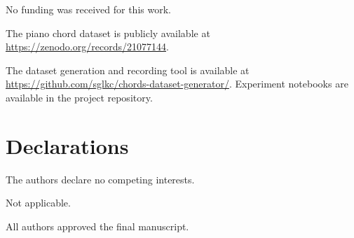 \documentclass[pdflatex,sn-mathphys-num,iicol]{sn-jnl}
\theoremstyle{thmstyleone}
\theoremstyle{thmstyletwo}
\theoremstyle{thmstylethree}
\begin{document}
No funding was received for this work.

The piano chord dataset is publicly available at \url{https://zenodo.org/records/21077144}.

The dataset generation and recording tool is available at \url{https://github.com/sglkc/chords-dataset-generator/}. Experiment notebooks are available in the project repository.

\section*{Declarations}

The authors declare no competing interests.

Not applicable.

All authors approved the final manuscript.


\end{document}
